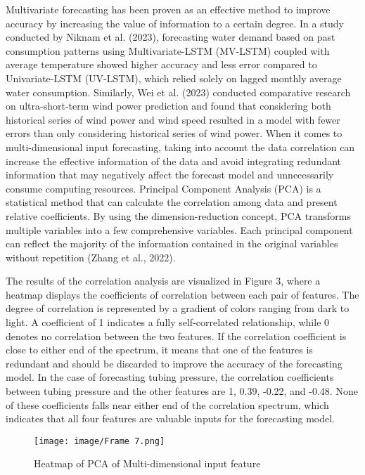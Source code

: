 \documentclass[sn-mathphys,Numbered]{sn-jnl}%
\theoremstyle{thmstyleone}%
\theoremstyle{thmstyletwo}%
\theoremstyle{thmstylethree}%
\begin{document}
Multivariate forecasting has been proven as an effective method to improve accuracy by increasing the value of information to a certain degree. In a study conducted by Niknam et al. (2023), forecasting water demand based on past consumption patterns using Multivariate-LSTM (MV-LSTM) coupled with average temperature showed higher accuracy and less error compared to Univariate-LSTM (UV-LSTM), which relied solely on lagged monthly average water consumption. Similarly, Wei et al. (2023) conducted comparative research on ultra-short-term wind power prediction and found that considering both historical series of wind power and wind speed resulted in a model with fewer errors than only considering historical series of wind power. When it comes to multi-dimensional input forecasting, taking into account the data correlation can increase the effective information of the data and avoid integrating redundant information that may negatively affect the forecast model and unnecessarily consume computing resources. Principal Component Analysis (PCA) is a statistical method that can calculate the correlation among data and present relative coefficients. By using the dimension-reduction concept, PCA transforms multiple variables into a few comprehensive variables. Each principal component can reflect the majority of the information contained in the original variables without repetition (Zhang et al., 2022).

The results of the correlation analysis are visualized in Figure 3, where a heatmap displays the coefficients of correlation between each pair of features. The degree of correlation is represented by a gradient of colors ranging from dark to light. A coefficient of 1 indicates a fully self-correlated relationship, while 0 denotes no correlation between the two features. If the correlation coefficient is close to either end of the spectrum, it means that one of the features is redundant and should be discarded to improve the accuracy of the forecasting model. In the case of forecasting tubing pressure, the correlation coefficients between tubing pressure and the other features are 1, 0.39, -0.22, and -0.48. None of these coefficients falls near either end of the correlation spectrum, which indicates that all four features are valuable inputs for the forecasting model.

\begin{figure}[htp]
    \centering
    \texttt{[image: image/Frame 7.png]}
    \caption{\centering Heatmap of PCA of Multi-dimensional input feature}
    \label{fig:PCA}
\end{figure}
\end{document}
